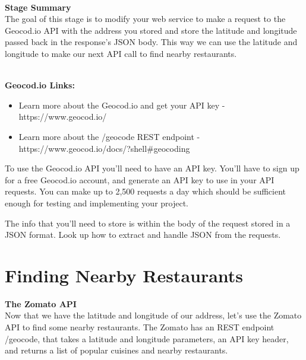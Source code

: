 \documentclass{article}
\begin{document}
\-\ \\
\textbf{Stage Summary}\\
The goal of this stage is to modify your web service to make a request to the Geocod.io API with the address you stored and store the latitude and longitude passed back in the response's JSON body. This way we can use the latitude and longitude to make our next API call to find nearby restaurants. 

\-\ \\
\textbf{Geocod.io Links:}
\begin{itemize}
\item  Learn more about the Geocod.io and get your API key - https://www.geocod.io/
\item Learn more about the /geocode REST endpoint - https://www.geocod.io/docs/?shell\#geocoding
\end{itemize}

\begin{info}
To use the Geocod.io API you'll need to have an API key. You'll have to sign up for a free Geocod.io account, and generate an API key to use in your API requests. You can make up to 2,500 requests a day which should be sufficient enough for testing and implementing your project. 
\end{info}

\begin{info}
The info that you'll need to store is within the body of the request stored in a JSON format. Look up how to extract and handle JSON from the requests.
\end{info}




\section{Finding Nearby Restaurants}
\textbf{The Zomato API}\\
Now that we have the latitude and longitude of our address, let's use the Zomato API to find some nearby restaurants. The Zomato has an REST endpoint /geocode, that takes a latitude and longitude parameters, an API key header, and returns a list of popular cuisines and nearby restaurants.
\end{document}
